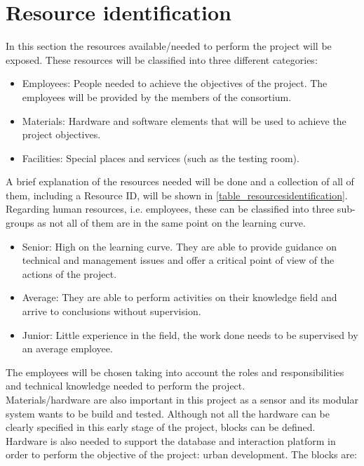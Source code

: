 \section{Resource identification}
\label{sec4.1}

In this section the resources available/needed to perform the project will be exposed. These resources will be classified into three different categories: 
\begin{itemize}
\item Employees: People needed to achieve the objectives of the project. The employees will be provided by the members of the consortium. 
\item Materials: Hardware and software elements that will be used to achieve the project objectives.
\item Facilities: Special places and services (such as the testing room). 
\end{itemize}
A brief explanation of the resources needed will be done and a collection of all of them, including a Resource ID, will be shown in \ref{table_resourcesidentification}.\\
Regarding human resources, i.e. employees, these can be classified into three sub-groups as not all of them are in the same point on the learning curve.
\begin{itemize}
\item Senior: High on the learning curve. They are able to provide guidance on technical and management issues and offer a critical point of view of the actions of the project.
\item Average: They are able to perform activities on their knowledge field and arrive to conclusions without supervision.
\item Junior: Little experience in the field, the work done needs to be supervised by an average employee.
\end{itemize}
The employees will be chosen taking into account the roles and responsibilities and technical knowledge needed to perform the project.\\
Materials/hardware are also important in this project as a sensor and its modular system wants to be build and tested. Although not all the hardware can be clearly specified in this early stage of the project, blocks can be defined. Hardware is also needed to support the database and interaction platform in order to perform the objective of the project: urban development. The blocks are: 
